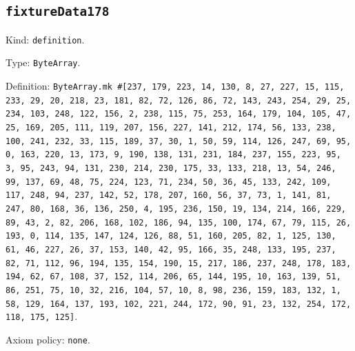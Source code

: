 \documentclass[11pt]{article}
\begin{document}
\subsection*{\texttt{fixtureData178}}
\noindent Kind: \texttt{definition}.\par
\noindent Type: \texttt{ByteArray}.\par
\noindent Definition: \texttt{ByteArray.mk \#[237, 179, 223, 14, 130, 8, 27, 227, 15, 115, 233, 29, 20, 218, 23, 181, 82, 72, 126, 86, 72, 143, 243, 254, 29, 25, 234, 103, 248, 122, 156, 2, 238, 115, 75, 253, 164, 179, 104, 105, 47, 25, 169, 205, 111, 119, 207, 156, 227, 141, 212, 174, 56, 133, 238, 100, 241, 232, 33, 115, 189, 37, 30, 1, 50, 59, 114, 126, 247, 69, 95, 0, 163, 220, 13, 173, 9, 190, 138, 131, 231, 184, 237, 155, 223, 95, 3, 95, 243, 94, 131, 230, 214, 230, 175, 33, 133, 218, 13, 54, 246, 99, 137, 69, 48, 75, 224, 123, 71, 234, 50, 36, 45, 133, 242, 109, 117, 248, 94, 237, 142, 52, 178, 207, 160, 56, 37, 73, 1, 141, 81, 247, 80, 168, 36, 136, 250, 4, 195, 236, 150, 19, 134, 214, 166, 229, 89, 43, 2, 82, 206, 168, 102, 186, 94, 135, 100, 174, 67, 79, 115, 26, 193, 0, 114, 135, 147, 124, 126, 88, 51, 160, 205, 82, 1, 125, 130, 61, 46, 227, 26, 37, 153, 140, 42, 95, 166, 35, 248, 133, 195, 237, 82, 71, 112, 96, 194, 135, 154, 190, 15, 217, 186, 237, 248, 178, 183, 194, 62, 67, 108, 37, 152, 114, 206, 65, 144, 195, 10, 163, 139, 51, 86, 251, 75, 10, 32, 216, 104, 57, 10, 8, 98, 236, 159, 183, 132, 1, 58, 129, 164, 137, 193, 102, 221, 244, 172, 90, 91, 23, 132, 254, 172, 118, 175, 125]}.\par
\noindent Axiom policy: \texttt{none}.\par
\end{document}
